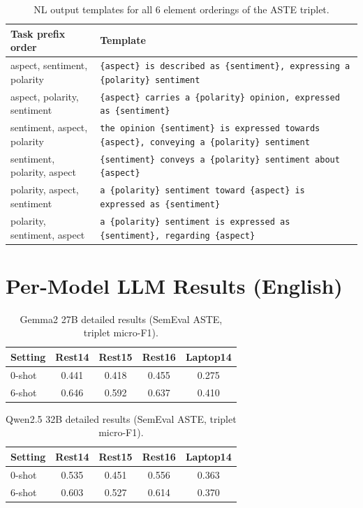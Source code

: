 \documentclass[12pt,a4paper]{report}
\begin{document}
\begin{table}[H]
\centering
\caption{NL output templates for all 6 element orderings of the ASTE triplet.}
\small
\begin{tabular}{@{}lp{10.5cm}@{}}
\toprule
\textbf{Task prefix order} & \textbf{Template} \\
\midrule
aspect, sentiment, polarity & \texttt{\{aspect\} is described as \{sentiment\}, expressing a \{polarity\} sentiment} \\
aspect, polarity, sentiment & \texttt{\{aspect\} carries a \{polarity\} opinion, expressed as \{sentiment\}} \\
sentiment, aspect, polarity & \texttt{the opinion \{sentiment\} is expressed towards \{aspect\}, conveying a \{polarity\} sentiment} \\
sentiment, polarity, aspect & \texttt{\{sentiment\} conveys a \{polarity\} sentiment about \{aspect\}} \\
polarity, aspect, sentiment & \texttt{a \{polarity\} sentiment toward \{aspect\} is expressed as \{sentiment\}} \\
polarity, sentiment, aspect & \texttt{a \{polarity\} sentiment is expressed as \{sentiment\}, regarding \{aspect\}} \\
\bottomrule
\end{tabular}
\end{table}


\section{Per-Model LLM Results (English)}

\begin{table}[H]
\centering
\caption{Gemma2 27B detailed results (SemEval ASTE, triplet micro-F1).}
\small
\begin{tabular}{@{}lcccc@{}}
\toprule
\textbf{Setting} & \textbf{Rest14} & \textbf{Rest15} & \textbf{Rest16} & \textbf{Laptop14} \\
\midrule
0-shot & 0.441 & 0.418 & 0.455 & 0.275 \\
6-shot & 0.646 & 0.592 & 0.637 & 0.410 \\
\bottomrule
\end{tabular}
\end{table}

\begin{table}[H]
\centering
\caption{Qwen2.5 32B detailed results (SemEval ASTE, triplet micro-F1).}
\small
\begin{tabular}{@{}lcccc@{}}
\toprule
\textbf{Setting} & \textbf{Rest14} & \textbf{Rest15} & \textbf{Rest16} & \textbf{Laptop14} \\
\midrule
0-shot & 0.535 & 0.451 & 0.556 & 0.363 \\
6-shot & 0.603 & 0.527 & 0.614 & 0.370 \\
\bottomrule
\end{tabular}
\end{table}
\end{document}
